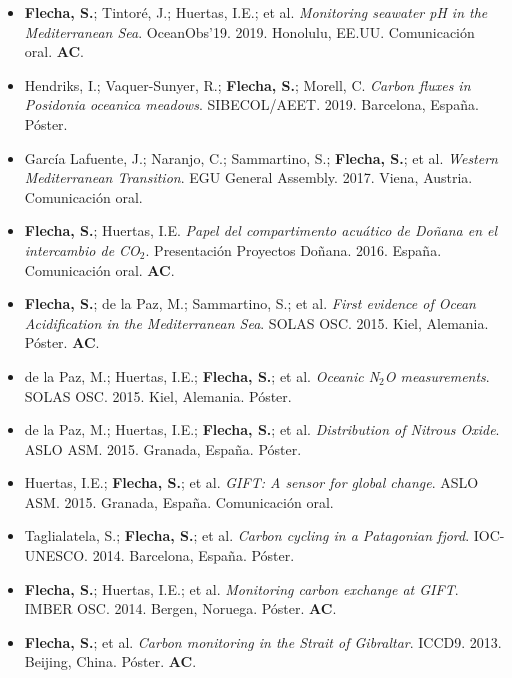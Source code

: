 \documentclass[11pt,a4paper]{article}
\begin{document}
\begin{itemize}[leftmargin=*]
\item[23.] \textbf{Flecha, S.}; Tintoré, J.; Huertas, I.E.; et al. 
\textit{Monitoring seawater pH in the Mediterranean Sea}. 
OceanObs’19. 2019. Honolulu, EE.UU. Comunicación oral. \textbf{AC}.

\item[22.] Hendriks, I.; Vaquer-Sunyer, R.; \textbf{Flecha, S.}; Morell, C. 
\textit{Carbon fluxes in Posidonia oceanica meadows}. 
SIBECOL/AEET. 2019. Barcelona, España. Póster.

\item[21.] García Lafuente, J.; Naranjo, C.; Sammartino, S.; \textbf{Flecha, S.}; et al. 
\textit{Western Mediterranean Transition}. 
EGU General Assembly. 2017. Viena, Austria. Comunicación oral.

\item[20.] \textbf{Flecha, S.}; Huertas, I.E. 
\textit{Papel del compartimento acuático de Doñana en el intercambio de CO$_2$}. 
Presentación Proyectos Doñana. 2016. España. Comunicación oral. \textbf{AC}.

\item[19.] \textbf{Flecha, S.}; de la Paz, M.; Sammartino, S.; et al. 
\textit{First evidence of Ocean Acidification in the Mediterranean Sea}. 
SOLAS OSC. 2015. Kiel, Alemania. Póster. \textbf{AC}.

\item[18.] de la Paz, M.; Huertas, I.E.; \textbf{Flecha, S.}; et al. 
\textit{Oceanic N$_2$O measurements}. 
SOLAS OSC. 2015. Kiel, Alemania. Póster.

\item[17.] de la Paz, M.; Huertas, I.E.; \textbf{Flecha, S.}; et al. 
\textit{Distribution of Nitrous Oxide}. 
ASLO ASM. 2015. Granada, España. Póster.

\item[16.] Huertas, I.E.; \textbf{Flecha, S.}; et al. 
\textit{GIFT: A sensor for global change}. 
ASLO ASM. 2015. Granada, España. Comunicación oral.

\item[15.] Taglialatela, S.; \textbf{Flecha, S.}; et al. 
\textit{Carbon cycling in a Patagonian fjord}. 
IOC-UNESCO. 2014. Barcelona, España. Póster.

\item[14.] \textbf{Flecha, S.}; Huertas, I.E.; et al. 
\textit{Monitoring carbon exchange at GIFT}. 
IMBER OSC. 2014. Bergen, Noruega. Póster. \textbf{AC}.

\item[13.] \textbf{Flecha, S.}; et al. 
\textit{Carbon monitoring in the Strait of Gibraltar}. 
ICCD9. 2013. Beijing, China. Póster. \textbf{AC}.


\end{itemize}
\end{document}
